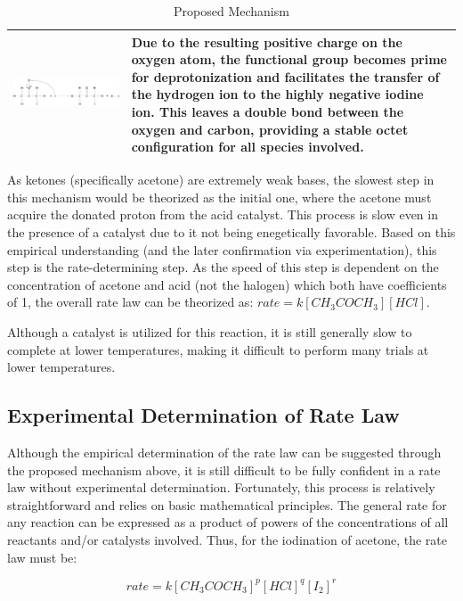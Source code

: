 \begin{table}[h!]
\begin{tabular}{m{6cm} m{10cm}}
 \midrule
  \includegraphics[width=.35\textwidth]{fig/images/mechanism/deprotonization.pdf} & Due to the resulting positive charge on the oxygen atom, the functional group becomes prime for deprotonization and facilitates the transfer of the hydrogen ion to the highly negative iodine ion. This leaves a double bond between the oxygen and carbon, providing a stable octet configuration for all species involved. \TBstrut\\
  \bottomrule
\end{tabular}
\caption{Proposed Mechanism}
\label{table:suggested_mechanism}
\end{table}

As ketones (specifically acetone) are extremely weak bases, the slowest step in this mechanism would be theorized as the initial one, where the acetone must acquire the donated proton from the acid catalyst. This process is slow even in the presence of a catalyst due to it not being enegetically favorable. Based on this empirical understanding (and the later confirmation via experimentation), this step is the rate-determining step. As the speed of this step is dependent on the concentration of acetone and acid (not the halogen) which both have coefficients of 1, the overall rate law can be theorized as: $rate = k[CH_3COCH_3][HCl]$.

Although a catalyst is utilized for this reaction, it is still generally slow to complete at lower temperatures, making it difficult to perform many trials at lower temperatures. 

\subsection{Experimental Determination of Rate Law}

Although the empirical determination of the rate law can be suggested through the proposed mechanism above, it is still difficult to be fully confident in a rate law without experimental determination. Fortunately, this process is relatively straightforward and relies on basic mathematical principles. The general rate for any reaction can be expressed as a product of powers of the concentrations of all reactants and/or catalysts involved. Thus, for the iodination of acetone, the rate law must be:

\[rate = k[CH_3COCH_3]^p[HCl]^q[I_2]^r\]

